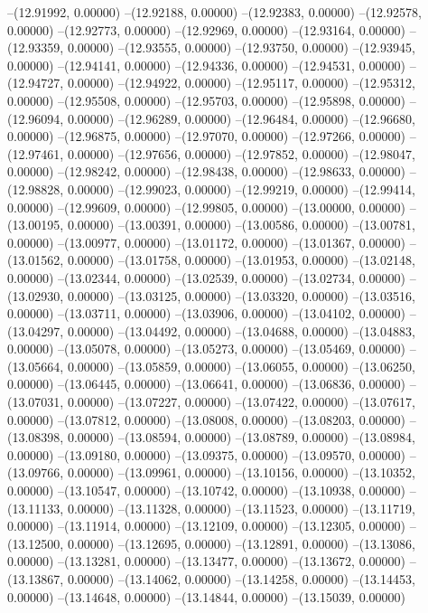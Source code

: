 --(12.91992, 0.00000)
--(12.92188, 0.00000)
--(12.92383, 0.00000)
--(12.92578, 0.00000)
--(12.92773, 0.00000)
--(12.92969, 0.00000)
--(12.93164, 0.00000)
--(12.93359, 0.00000)
--(12.93555, 0.00000)
--(12.93750, 0.00000)
--(12.93945, 0.00000)
--(12.94141, 0.00000)
--(12.94336, 0.00000)
--(12.94531, 0.00000)
--(12.94727, 0.00000)
--(12.94922, 0.00000)
--(12.95117, 0.00000)
--(12.95312, 0.00000)
--(12.95508, 0.00000)
--(12.95703, 0.00000)
--(12.95898, 0.00000)
--(12.96094, 0.00000)
--(12.96289, 0.00000)
--(12.96484, 0.00000)
--(12.96680, 0.00000)
--(12.96875, 0.00000)
--(12.97070, 0.00000)
--(12.97266, 0.00000)
--(12.97461, 0.00000)
--(12.97656, 0.00000)
--(12.97852, 0.00000)
--(12.98047, 0.00000)
--(12.98242, 0.00000)
--(12.98438, 0.00000)
--(12.98633, 0.00000)
--(12.98828, 0.00000)
--(12.99023, 0.00000)
--(12.99219, 0.00000)
--(12.99414, 0.00000)
--(12.99609, 0.00000)
--(12.99805, 0.00000)
--(13.00000, 0.00000)
--(13.00195, 0.00000)
--(13.00391, 0.00000)
--(13.00586, 0.00000)
--(13.00781, 0.00000)
--(13.00977, 0.00000)
--(13.01172, 0.00000)
--(13.01367, 0.00000)
--(13.01562, 0.00000)
--(13.01758, 0.00000)
--(13.01953, 0.00000)
--(13.02148, 0.00000)
--(13.02344, 0.00000)
--(13.02539, 0.00000)
--(13.02734, 0.00000)
--(13.02930, 0.00000)
--(13.03125, 0.00000)
--(13.03320, 0.00000)
--(13.03516, 0.00000)
--(13.03711, 0.00000)
--(13.03906, 0.00000)
--(13.04102, 0.00000)
--(13.04297, 0.00000)
--(13.04492, 0.00000)
--(13.04688, 0.00000)
--(13.04883, 0.00000)
--(13.05078, 0.00000)
--(13.05273, 0.00000)
--(13.05469, 0.00000)
--(13.05664, 0.00000)
--(13.05859, 0.00000)
--(13.06055, 0.00000)
--(13.06250, 0.00000)
--(13.06445, 0.00000)
--(13.06641, 0.00000)
--(13.06836, 0.00000)
--(13.07031, 0.00000)
--(13.07227, 0.00000)
--(13.07422, 0.00000)
--(13.07617, 0.00000)
--(13.07812, 0.00000)
--(13.08008, 0.00000)
--(13.08203, 0.00000)
--(13.08398, 0.00000)
--(13.08594, 0.00000)
--(13.08789, 0.00000)
--(13.08984, 0.00000)
--(13.09180, 0.00000)
--(13.09375, 0.00000)
--(13.09570, 0.00000)
--(13.09766, 0.00000)
--(13.09961, 0.00000)
--(13.10156, 0.00000)
--(13.10352, 0.00000)
--(13.10547, 0.00000)
--(13.10742, 0.00000)
--(13.10938, 0.00000)
--(13.11133, 0.00000)
--(13.11328, 0.00000)
--(13.11523, 0.00000)
--(13.11719, 0.00000)
--(13.11914, 0.00000)
--(13.12109, 0.00000)
--(13.12305, 0.00000)
--(13.12500, 0.00000)
--(13.12695, 0.00000)
--(13.12891, 0.00000)
--(13.13086, 0.00000)
--(13.13281, 0.00000)
--(13.13477, 0.00000)
--(13.13672, 0.00000)
--(13.13867, 0.00000)
--(13.14062, 0.00000)
--(13.14258, 0.00000)
--(13.14453, 0.00000)
--(13.14648, 0.00000)
--(13.14844, 0.00000)
--(13.15039, 0.00000)

